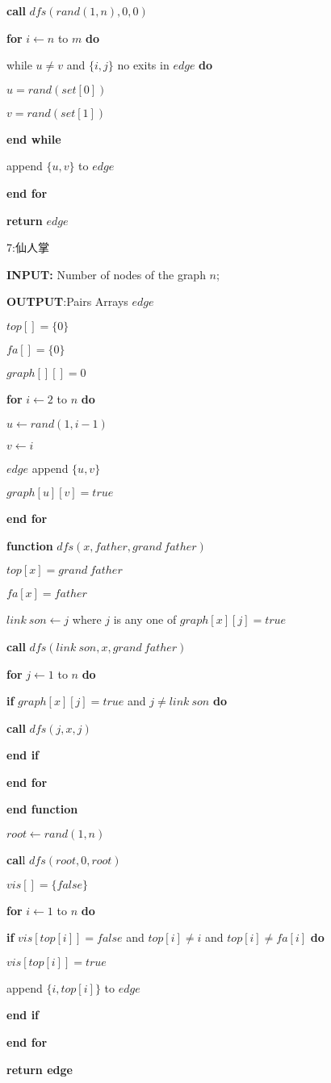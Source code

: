 \documentclass[
]{article}
\begin{document}
\textbf{call} \(dfs(rand(1,n),0,0)\)

\textbf{for} \(i\gets n\) to \(m\) \textbf{do}

while \(u \neq v\) and \(\{i,j\}\) no exits in \(edge\) \textbf{do}

\(u=rand(set[0])\)

\(v=rand(set[1])\)

\textbf{end while}

append \(\{u,v\}\) to \(edge\)

\textbf{end for}

\textbf{return} \(edge\)

7:仙人掌

\textbf{INPUT:} Number of nodes of the graph \(n\);

\textbf{OUTPUT}:Pairs Arrays \(edge\)

\(top[]=\{0\}\)

\(fa[]=\{0\}\)

\(graph[][]={0}\)

\textbf{for} \(i\gets 2\) to \(n\) \textbf{do}

\(u\gets rand(1,i-1)\)

\(v\gets i\)

\(edge\) append \(\{u,v\}\)

\(graph[u][v]=true\)

\textbf{end for}

\textbf{function} \(dfs (x,father,grand\ father)\)

\(top[x]=grand\ father\)

\(fa[x]=father\)

\(link\ son\gets j\) where \(j\) is any one of \(graph[x][j]=true\)

\textbf{call} \(dfs(link\ son,x,grand\ father)\)

\textbf{for} \(j\gets 1\) to \(n\) \textbf{do}

\textbf{if} \(graph[x][j]=true\) and \(j\neq link\ son\) \textbf{do}

\textbf{call} \(dfs(j,x,j)\)

\textbf{end if}

\textbf{end for}

\textbf{end function}

\(root\gets rand(1,n)\)

\textbf{cal}l \(dfs(root,0,root)\)

\(vis[]=\{false\}\)

\textbf{for} \(i\gets 1\) to \(n\) \textbf{do}

\textbf{if} \(vis[top[i]]=false\) and \(top[i]\neq i\) and
\(top[i]\neq fa[i]\) \textbf{do}

\(vis[top[i]]=true\)

append \(\{i,top[i]\} \) to \(edge\)

\textbf{end if}

\textbf{end for}

\textbf{return edge}
\end{document}
